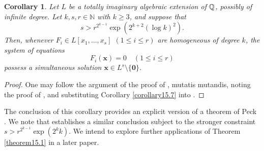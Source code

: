 \documentclass[12pt,reqno]{amsart}
\newtheorem{corollary}[theorem]{Corollary}
\theoremstyle{definition}
\theoremstyle{remark}
\numberwithin{equation}{section}
\def\bfx{{\mathbf x}}
\def\dbN{{\mathbb N}} \def\dbO{{\mathbb O}} \def\dbP{{\mathbb P}}
\def\le{\leqslant} \def\ge{\geqslant} \def\pleq{\preccurlyeq} \def\ple{\prec}
\begin{document}
\begin{corollary}\label{corollary15.8} Let $L$ be a totally imaginary algebraic extension of 
${\mathbb Q}$, possibly of infinite degree. Let $k,s,r\in \dbN$ with $k\ge 3$, and suppose that
$$s>r^{2^{k-1}}\exp(2^{k+2}(\log k)^2).$$
Then, whenever $F_i\in L[x_1,\ldots ,x_s]$ $(1\le i\le r)$ are homogeneous of degree $k$, 
the system of equations
$$F_i(\bfx)=0\quad (1\le i\le r)$$
possess a simultaneous solution $\bfx\in L^s\setminus \{{\mathbf 0}\}$.
\end{corollary}

\begin{proof} One may follow the argument of the proof of \cite[Corollary 1.3]{Woo1998}, 
mutatis mutandis, noting the proof of \cite[Theorem 4.4]{Woo2016b}, and substituting 
Corollary \ref{corollary15.7} into \cite[Theorem 1]{Woo1998}.
\end{proof}

The conclusion of this corollary provides an explicit version of a theorem of Peck 
\cite{Pec1949}. We note that \cite[Corollary 1.3]{Woo1998} establishes a similar conclusion 
subject to the stronger constraint $s>r^{2^{k-1}}\exp(2^kk)$. We intend to explore 
further applications of Theorem \ref{theorem15.1} in a later paper.
\end{document}
